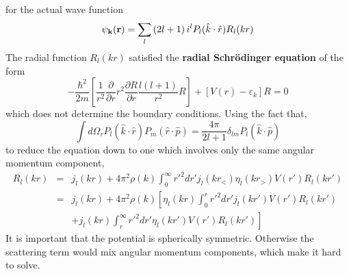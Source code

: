 for the actual wave function
\begin{equation}
    \psi_{\mathbf{k}}(\mathbf{r}) = \sum_l \left( 2l+1 \right) i^l P_l(\hat{k} \cdot \hat{r}) R_l(kr)   \label{4.20}
\end{equation}
The radial function $R_l(kr)$ satisfied the \textbf{radial Schr{\"o}dinger equation} of the form
\begin{equation}
    - \frac{\hbar^2}{2m} \left[ \frac{1}{r^2} \frac{\partial}{\partial r} r^2 \frac{\partial R}{\partial r} \frac{l(l+1)}{r^2} R \right] + \left[ V(r) - \varepsilon_k \right] R = 0    \label{4.21}
\end{equation}
which does not determine the boundary conditions.
Using the fact that,
\begin{equation}
    \int d \Omega_r P_l(\hat{k}\cdot\hat{r}) P_m(\hat{r}\cdot\hat{p}) = \frac{4\pi}{2l+1} \delta_{lm} P_l(\hat{k}\cdot\hat{p})  \label{4.22}
\end{equation}
to reduce the equation down to one which involves only the same angular momentum component,
\begin{eqnarray}
    R_l(kr) &=& j_l(kr) + 4\pi^2 \rho(k)  \int_0^\infty r'^2 dr' j_l(kr_<) \eta_l(kr_>) V(r') R_l(kr') \nonumber \\
    &=& j_l(kr) + 4\pi^2 \rho(k) \left[ \eta_l(kr) \int_0^r r'^2 dr' j_l(kr') V(r') R_l(kr') \right. \nonumber \\
    &~ ~ &  + \left. j_l(kr) \int_r^\infty r'^2 dr' \eta_l(kr') V(r') R_l(kr') \right] \label{4.23}
\end{eqnarray}
It is important that the potential is spherically symmetric.
Otherwise the scattering term would mix angular momentum components, which make it hard to solve.

